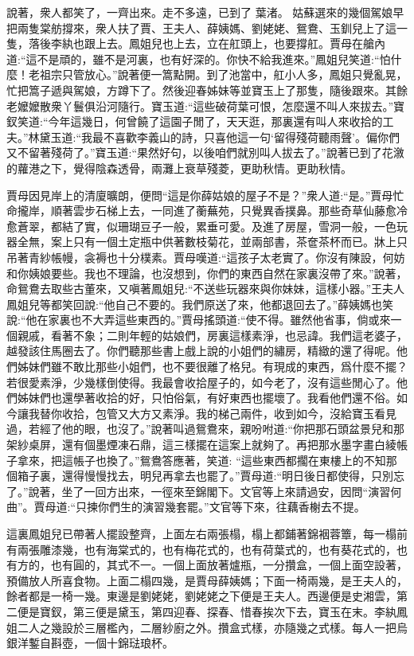 \begin{parag}
    說著，衆人都笑了，一齊出來。走不多遠，已到了 葉渚。 姑蘇選來的幾個駕娘早把兩隻棠舫撐來，衆人扶了賈、王夫人、薛姨媽、劉姥姥、鴛鴦、玉釧兒上了這一隻，落後李紈也跟上去。鳳姐兒也上去，立在舡頭上，也要撐舡。賈母在艙內道:“這不是頑的，雖不是河裏，也有好深的。你快不給我進來。”鳳姐兒笑道:“怕什麼！老祖宗只管放心。”說著便一篙點開。到了池當中，舡小人多，鳳姐只覺亂晃，忙把篙子遞與駕娘，方蹲下了。然後迎春姊妹等並寶玉上了那隻，隨後跟來。其餘老嬤嬤散衆丫鬟俱沿河隨行。寶玉道:“這些破荷葉可恨，怎麼還不叫人來拔去。”寶釵笑道:“今年這幾日，何曾饒了這園子閒了，天天逛，那裏還有叫人來收拾的工夫。”林黛玉道:“我最不喜歡李義山的詩，只喜他這一句‘留得殘荷聽雨聲’。偏你們又不留著殘荷了。”寶玉道:“果然好句，以後咱們就別叫人拔去了。”說著已到了花漵的蘿港之下，覺得陰森透骨，兩灘上衰草殘菱，更助秋情。更助秋情。
\end{parag}


\begin{parag}
    賈母因見岸上的清廈曠朗，便問“這是你薛姑娘的屋子不是？”衆人道:“是。”賈母忙命攏岸，順著雲步石梯上去，一同進了蘅蕪苑，只覺異香撲鼻。那些奇草仙藤愈冷愈蒼翠，都結了實，似珊瑚豆子一般，累垂可愛。及進了房屋，雪洞一般，一色玩器全無，案上只有一個土定瓶中供著數枝菊花，並兩部書，茶奩茶杯而已。牀上只吊著青紗帳幔，衾褥也十分樸素。賈母嘆道:“這孩子太老實了。你沒有陳設，何妨和你姨娘要些。我也不理論，也沒想到，你們的東西自然在家裏沒帶了來。”說著，命鴛鴦去取些古董來，又嗔著鳳姐兒:“不送些玩器來與你妹妹，這樣小器。”王夫人鳳姐兒等都笑回說:“他自己不要的。我們原送了來，他都退回去了。”薛姨媽也笑說:“他在家裏也不大弄這些東西的。”賈母搖頭道:“使不得。雖然他省事，倘或來一個親戚，看著不象；二則年輕的姑娘們，房裏這樣素淨，也忌諱。我們這老婆子，越發該住馬圈去了。你們聽那些書上戲上說的小姐們的繡房，精緻的還了得呢。他們姊妹們雖不敢比那些小姐們，也不要很離了格兒。有現成的東西，爲什麼不擺？若很愛素淨，少幾樣倒使得。我最會收拾屋子的，如今老了，沒有這些閒心了。他們姊妹們也還學著收拾的好，只怕俗氣，有好東西也擺壞了。我看他們還不俗。如今讓我替你收拾，包管又大方又素淨。我的梯己兩件，收到如今，沒給寶玉看見過，若經了他的眼，也沒了。”說著叫過鴛鴦來，親吩咐道:“你把那石頭盆景兒和那架紗桌屏，還有個墨煙凍石鼎，這三樣擺在這案上就夠了。再把那水墨字畫白綾帳子拿來，把這帳子也換了。”鴛鴦答應著，笑道: “這些東西都擱在東樓上的不知那個箱子裏，還得慢慢找去，明兒再拿去也罷了。”賈母道:“明日後日都使得，只別忘了。”說著，坐了一回方出來，一徑來至錦閣下。文官等上來請過安，因問“演習何曲”。賈母道:“只揀你們生的演習幾套罷。”文官等下來，往藕香榭去不提。
\end{parag}


\begin{parag}
    這裏鳳姐兒已帶著人擺設整齊，上面左右兩張榻，榻上都鋪著錦裀蓉簟，每一榻前有兩張雕漆幾，也有海棠式的，也有梅花式的，也有荷葉式的，也有葵花式的，也有方的，也有圓的，其式不一。一個上面放著爐瓶，一分攢盒，一個上面空設著，預備放人所喜食物。上面二榻四幾，是賈母薛姨媽；下面一椅兩幾，是王夫人的，餘者都是一椅一幾。東邊是劉姥姥，劉姥姥之下便是王夫人。西邊便是史湘雲，第二便是寶釵，第三便是黛玉，第四迎春、探春、惜春挨次下去，寶玉在末。李紈鳳姐二人之幾設於三層檻內，二層紗廚之外。攢盒式樣，亦隨幾之式樣。每人一把烏銀洋鏨自斟壺，一個十錦琺琅杯。
\end{parag}


